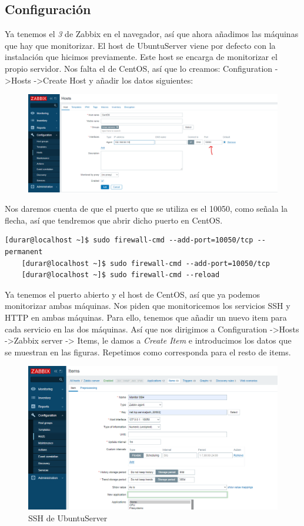 \documentclass[a4paper]{article}
\begin{document}
\subsection{Configuración}
Ya tenemos el \textsl{3} de Zabbix en el navegador, así que ahora añadimos las máquinas que hay que monitorizar.
El host de UbuntuServer viene por defecto con la instalación que hicimos previamente. Este host se encarga 
de monitorizar el propio servidor. Nos falta el de CentOS, así que lo creamos:
Configuration -\textgreater Hosts -\textgreater Create Host y añadir los datos siguientes:
\newpage
\begin{figure}
    \centering
    \includegraphics[width=\textwidth]{creando host centos.png}
\end{figure}
Nos daremos cuenta de que el puerto que se utiliza es el 10050, como señala la flecha, así que tendremos 
que abrir dicho puerto en CentOS.
\begin{lstlisting}[style=bashCentOS]
    [durar@localhost ~]$ sudo firewall-cmd --add-port=10050/tcp --permanent
    [durar@localhost ~]$ sudo firewall-cmd --add-port=10050/tcp
    [durar@localhost ~]$ sudo firewall-cmd --reload
\end{lstlisting}
Ya tenemos el puerto abierto y el host de CentOS, así que ya podemos monitorizar ambas máquinas.
Nos piden que monitoricemos los servicios SSH y HTTP en ambas máquinas. Para ello, tenemos que añadir
un nuevo item para cada servicio en las dos máquinas. 
Así que nos dirigimos a Configuration -\textgreater Hosts -\textgreater Zabbix server -\textgreater
Items, le damos a \textsl{Create Item} e introducimos los datos que se muestran en las figuras. Repetimos como 
corresponda para el resto de items.
\newline
\begin{figure}[hbt!]
    \caption{SSH de UbuntuServer}
    \includegraphics[width=\textwidth]{creando item ssh.png}
\end{figure} 
\end{document}

